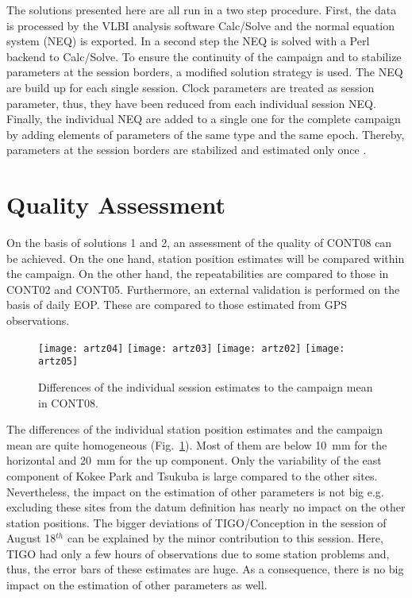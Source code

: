 \documentclass[natbib,twocolumn,twoside]{svmultiag}
\begin{document}
The solutions presented here are all run in a two step procedure.
First, the data is processed by the VLBI analysis software Calc/Solve 
\citep{solve} and the normal equation system (NEQ) is exported.
In a second step the NEQ is solved with a Perl backend to Calc/Solve.
To ensure the continuity of the campaign and to stabilize parameters at the 
session borders, a modified solution strategy is used.
The NEQ are build up for each single session.
Clock parameters are treated as session parameter, thus, they have been
reduced from each individual session NEQ.
Finally, the individual NEQ are added to a single one for the complete
campaign by adding elements of parameters of the same type and the same epoch.
Thereby, parameters at the session borders are stabilized and estimated only
once \citep{Artz2007}.


\section{Quality Assessment}
On the basis of solutions 1 and 2, an assessment of the quality of CONT08
can be achieved.
On the one hand, station position estimates will be compared within the
campaign.
On the other hand, the repeatabilities are compared to those in CONT02
and CONT05.
Furthermore, an external validation is performed on the basis of daily EOP.
These are compared to those estimated from GPS observations.

\begin{figure}[tb]
         \centering
         \texttt{[image: artz04]}
         \texttt{[image: artz03]}
         \texttt{[image: artz02]}
         \texttt{[image: artz05]}
         \caption{Differences of the individual session estimates to the 
                  campaign mean in CONT08.}
         \label{fig:sta_est}
\end{figure}
The differences of the individual station position estimates and the 
campaign mean are quite homogeneous (Fig.~\ref{fig:sta_est}).
Most of them are below 10~mm for the horizontal and 20~mm for the up 
component.
Only the variability of the east component of Kokee Park and Tsukuba is large
compared to the other sites.
Nevertheless, the impact on the estimation of other parameters is not big 
e.g. excluding these sites from the datum definition has nearly no impact 
on the other station positions.
The bigger deviations of TIGO/Conception in the session of August 18$^{th}$
can be explained by the minor contribution to this session.
Here, TIGO had only a few hours of observations due to some station problems
and, thus, the error bars of these estimates are huge.
As a consequence, there is no big impact on the estimation of other parameters
as well.
\end{document}
